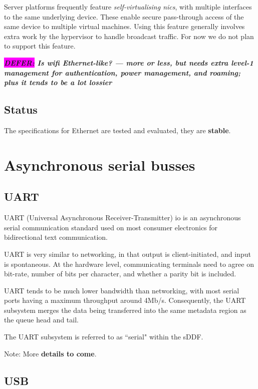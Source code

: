 \documentclass[a4paper,12pt]{report}
\newcommand{\DEFER}[1]{\textbf{\textsl{\colorbox{magenta}{DEFER:} #1}}}
\newcommand{\DEFER}[1]{\relax}
\begin{document}
Server platforms frequently feature \emph{self-virtualising
  \glspl{nic}}, with multiple interfaces to the same underlying
device. These enable secure pass-through access of the same device to
multiple virtual machines.  Using this feature generally involves
extra work by the hypervisor to handle broadcast traffic. For now we
do not plan to support this feature.

\DEFER{Is wifi Ethernet-like? --- more or less, but needs extra
  level-1 management for authentication, power management, and
  roaming; plus it tends to be a lot lossier}

\subsection{Status}

The specifications for Ethernet are tested and evaluated, they are
\textbf{stable}.

\section{Asynchronous serial busses}\label{s:cl-serial}

\subsection{UART}

UART (Universal Asynchronous Receiver-Transmitter) \gls{io} is an asynchronous
serial communication standard used on most consumer electronics for bidirectional
text communication.

UART is very similar to networking, in that output is
client-initiated, and input is spontaneous.  At the hardware level,
communicating terminals need to agree on bit-rate, number of bits per
character, and whether a parity bit is included.

UART tends to be much lower bandwidth than networking, with most serial
ports having a maximum throughput around 4Mb/s. Consequently, the UART
subsystem merges the data being transferred into the same metadata region
as the queue head and tail.

The UART subsystem is referred to as ``serial" within the sDDF.

Note: More \textbf{details to come}.

\subsection{USB}\label{s:cl-usb}
\end{document}
